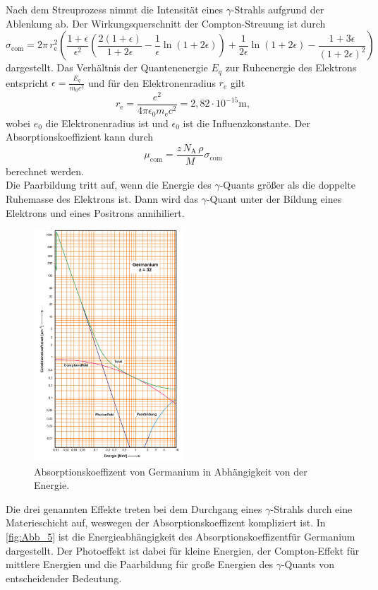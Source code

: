Nach dem Streuprozess nimmt die Intensität eines $\gamma$-Strahls aufgrund der Ablenkung ab. 
Der Wirkungsquerschnitt der Compton-Streuung ist durch
\begin{equation}
    \sigma_\mathrm{com}=2\pi\,r_\mathrm{e}^2\left(\frac{1+\epsilon}{\epsilon^2}\left(\frac{2(1+\epsilon)}{1+2\epsilon}-\frac{1}{\epsilon}\ln(1+2\epsilon) \right)+\frac{1}{2\epsilon}\ln(1+2\epsilon)-\frac{1+3\epsilon}{(1+2\epsilon)^2}\right)
    \label{eqn:sigmacom}
\end{equation}
dargestellt. Das Verhältnis der Quantenenergie $E_q$ zur Ruheenergie des Elektrons entspricht $\epsilon = \frac{E_q}{m_0c^2}$ 
und für den Elektronenradius $r_e$ gilt
\begin{equation*}
    r_\mathrm{e}=\frac{e^2}{4\pi\epsilon_0 m_\mathrm{e}c^2}=2,82\cdot10^{-15}\si{\meter},
\end{equation*}
wobei $e_0$ die Elektronenradius ist und $\epsilon_0$ ist die Influenzkonstante.
Der Absorptionskoeffizient kann durch
\begin{equation}
    \mu_\mathrm{com}=\frac{z\,N_\mathrm{A}\,\rho}{M}\sigma_\mathrm{com}
    \label{eqn:Absorptionskoeffizient}
\end{equation}
berechnet werden.\\
Die Paarbildung tritt auf, wenn die Energie des $\gamma$-Quants größer als die doppelte Ruhemasse des Elektrons ist.
Dann wird das $\gamma$-Quant unter der Bildung eines Elektrons und eines Positrons annihiliert.\\
\begin{figure}[H]
    \centering
    \includegraphics[width=0.5\textwidth]{build/Abb_5.png}
    \caption {Absorptionskoeffizent von Germanium in Abhängigkeit von der Energie\cite[236]{V704}.}
    \label{fig:Abb_5}
\end{figure}
Die drei genannten Effekte treten bei dem Durchgang eines $\gamma$-Strahls durch eine Materieschicht auf, weswegen der Absorptionskoeffizent kompliziert ist.
In \autoref{fig:Abb_5} ist die Energieabhängigkeit des Absorptionskoeffizentfür Germanium dargestellt.
Der Photoeffekt ist dabei für kleine Energien, der Compton-Effekt für mittlere Energien und die Paarbildung für große Energien des $\gamma$-Quants
von entscheidender Bedeutung.

